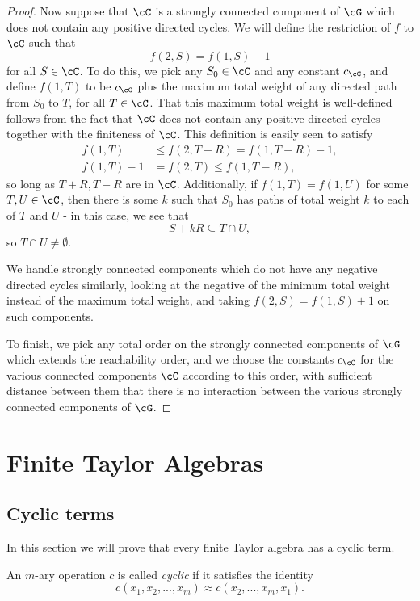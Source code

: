 \begin{proof}
Now suppose that $\cC$ is a strongly connected component of $\cG$ which does not contain any positive directed cycles. We will define the restriction of $f$ to $\cC$ such that
\[
f(2,S) = f(1,S) - 1
\]
for all $S \in \cC$. To do this, we pick any $S_0 \in \cC$ and any constant $c_\cC$, and define $f(1,T)$ to be $c_\cC$ plus the maximum total weight of any directed path from $S_0$ to $T$, for all $T \in \cC$. That this maximum total weight is well-defined follows from the fact that $\cC$ does not contain any positive directed cycles together with the finiteness of $\cC$. This definition is easily seen to satisfy
\begin{align*}
f(1,T) &\le f(2,T+R) = f(1,T+R)-1,\\
f(1,T)-1 &= f(2,T) \le f(1,T-R),
\end{align*}
so long as $T+R, T-R$ are in $\cC$. Additionally, if $f(1,T) = f(1,U)$ for some $T,U \in \cC$, then there is some $k$ such that $S_0$ has paths of total weight $k$ to each of $T$ and $U$ - in this case, we see that
\[
S + kR \subseteq T \cap U,
\]
so $T \cap U \ne \emptyset$.

We handle strongly connected components which do not have any negative directed cycles similarly, looking at the negative of the minimum total weight instead of the maximum total weight, and taking $f(2,S) = f(1,S) + 1$ on such components.

To finish, we pick any total order on the strongly connected components of $\cG$ which extends the reachability order, and we choose the constants $c_{\cC}$ for the various connected components $\cC$ according to this order, with sufficient distance between them that there is no interaction between the various strongly connected components of $\cG$.
\end{proof}


\chapter{Finite Taylor Algebras}\label{chapter-taylor}


\section{Cyclic terms}

In this section we will prove that every finite Taylor algebra has a cyclic term.

\begin{defn} An $m$-ary operation $c$ is called \emph{cyclic} if it satisfies the identity
\[
c(x_1, x_2, ..., x_m) \approx c(x_2, ..., x_m, x_1).
\]
\end{defn}

